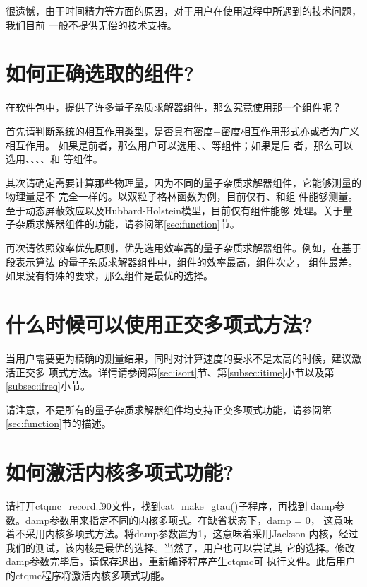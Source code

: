 {很遗憾，由于时间精力等方面的原因，对于用户在使用{\iqist}过程中所遇到的技术问题，我们目前
一般不提供无偿的技术支持。

\section{如何正确选取{\iqist}的组件?}
\label{app:choose}

在{\iqist}软件包中，提供了许多量子杂质求解器组件，那么究竟使用那一个组件呢？

首先请判断系统的相互作用类型，是否具有密度$-$密度相互作用形式亦或者为广义相互作用。
如果是前者，那么用户可以选用{\azalea}、{\gardenia}、{\narcissus}等组件；如果是后
者，那么可以选用{\begonia}、{\lavender}、{\camellia}、{\epiphyllum}、{\pansy}和
{\manjushaka}等组件。

其次请确定需要计算那些物理量，因为不同的量子杂质求解器组件，它能够测量的物理量是不
完全一样的。以双粒子格林函数为例，目前仅有{\gardenia}、{\narcissus}和{\lavender}组
件能够测量。至于动态屏蔽效应以及Hubbard-Holstein模型，目前仅有{\narcissus}组件能够
处理。关于量子杂质求解器组件的功能，请参阅第\ref{sec:function}节。

再次请依照效率优先原则，优先选用效率高的量子杂质求解器组件。例如，在基于段表示算法
的量子杂质求解器组件中，{\azalea}组件的效率最高，{\gardenia}组件次之，{\narcissus}
组件最差。如果没有特殊的要求，那么{\azalea}组件是最优的选择。

\section{什么时候可以使用正交多项式方法?}
\label{app:op}

当用户需要更为精确的测量结果，同时对计算速度的要求不是太高的时候，建议激活正交多
项式方法。详情请参阅第\ref{sec:isort}节、第\ref{subsec:itime}小节以及第\ref{subsec:ifreq}小节。

请注意，不是所有的量子杂质求解器组件均支持正交多项式功能，请参阅第
\ref{sec:function}节的描述。

\section{如何激活内核多项式功能?}
\label{app:kpm}

请打开ctqmc\_record.f90文件，找到cat\_make\_gtau()子程序，再找到
damp参数。damp参数用来指定不同的内核多项式。在缺省状态下，damp = 0，
这意味着不采用内核多项式方法。将damp参数置为1，这意味着采用Jackson
内核，经过我们的测试，该内核是最优的选择。当然了，用户也可以尝试其
它的选择。修改damp参数完毕后，请保存退出，重新编译程序产生ctqmc可
执行文件。此后用户的ctqmc程序将激活内核多项式功能。

}
